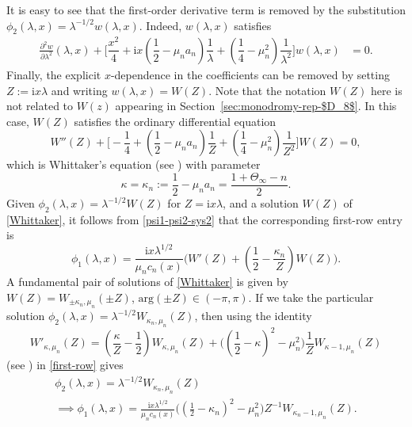\documentclass[pdftex]{sigma}
\numberwithin{equation}{section}
\newcommand{\ii}{\mathrm{i}}
\begin{document}
It is easy to see that the first-order derivative term is removed by the substitution $\phi_2(\lambda,x)=\lambda^{-1/2}w(\lambda,x)$.
Indeed, $w(\lambda,x)$ satisfies
\begin{align*}
 \frac{\partial^2w}{\partial\lambda^2}(\lambda,x) + \bigg[ \dfrac{x^2}{4} + \ii x\left( \dfrac{1}{2} - \mu_n a_n \right) \dfrac{1}{\lambda} + \left( \dfrac{1}{4} - \mu_n^2 \right) \dfrac{1}{\lambda^2} \bigg]w(\lambda,x) &= 0.
\end{align*}
Finally, the explicit $x$-dependence in the coefficients can be removed by setting $Z:= \ii x \lambda$ and writing $w(\lambda,x)=W(Z)$. Note that the notation $W(Z)$ here is not related to $W(z)$ appearing in Section~\ref{sec:monodromy-rep-$D_8$}. In this case, $W(Z)$ satisfies the ordinary differential equation
\begin{equation}
 W''(Z) + \bigg[ - \dfrac{1}{4} + \left( \dfrac{1}{2} - \mu_n a_n \right) \dfrac{1}{Z} + \left( \dfrac{1}{4} - \mu_n^2 \right) \dfrac{1}{Z^2} \bigg] W(Z) = 0,
 \label{Whittaker}
\end{equation}
which is Whittaker's equation (see \cite[Chapter~13]{DLMF}) with parameter
\begin{equation}\label{kappa-mu}
 \kappa = \kappa_n:=\frac{1}{2} - \mu_n a_n = \dfrac{1+\Theta_\infty - n }{2}.
\end{equation}
Given $\phi_2(\lambda,x)=\lambda^{-1/2}W(Z)$ for $Z=\ii x\lambda$, and a solution $W(Z)$ of \eqref{Whittaker}, it follows from \eqref{psi1-psi2-sys2} that the corresponding first-row entry is
\begin{equation}
 \phi_1(\lambda,x)=\frac{\ii x\lambda^{1/2}}{\mu_n c_n(x)}\bigg(W'(Z)+\left(\frac{1}{2}-\frac{\kappa_n}{Z}\right)W(Z)\bigg).
 \label{first-row}
\end{equation}
A fundamental pair of solutions of \eqref{Whittaker} is given by $W(Z)=W_{\pm \kappa_n, \mu_n} (\pm Z)$, $\mathrm{arg}(\pm Z) \in (-\pi, \pi) $.
If we take the particular solution $\phi_2(\lambda,x)=\lambda^{-1/2}W_{\kappa_n,\mu_n}(Z)$, then
using the identity
\begin{equation*}
 W'_{\kappa,\mu_n}(Z)=\left(\dfrac{\kappa}{Z}-\dfrac{1}{2}\right)W_{\kappa,\mu_n}(Z)+\bigg(\left(\dfrac{1}{2}-\kappa\right)^2-\mu_n^2\bigg)\frac{1}{Z}W_{\kappa-1,\mu_n}(Z)
\end{equation*}
(see \cite[equation~(13.15.23)]{DLMF}) in \eqref{first-row} gives
\begin{gather*}
 \phi_2(\lambda,x)=\lambda^{-1/2}W_{\kappa_n,\mu_n}(Z)\\
\implies \phi_1(\lambda,x)=\frac{\ii x\lambda^{1/2}}{\mu_n c_n(x)}\bigg(\left(\frac{1}{2}-\kappa_n\right)^2-\mu_n^2\bigg)Z^{-1}W_{\kappa_n-1,\mu_n}(Z).
\end{gather*}
\end{document}
